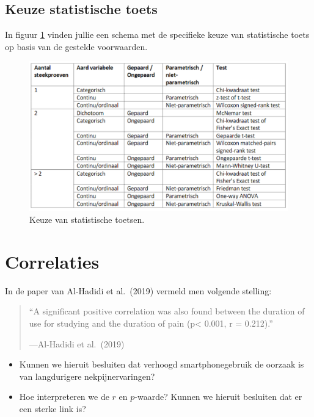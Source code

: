 \documentclass[
]{book}
\providecommand{\tightlist}{%
  \setlength{\itemsep}{0pt}\setlength{\parskip}{0pt}}
\theoremstyle{definition}
\theoremstyle{definition}
\theoremstyle{definition}
\theoremstyle{definition}
\theoremstyle{remark}
\begin{document}
\hypertarget{keuze-statistische-toets}{%
\section*{Keuze statistische toets}\label{keuze-statistische-toets}}


In figuur \ref{fig:stattest} vinden jullie een schema met de specifieke keuze van statistische toets op basis van de gestelde voorwaarden.

\begin{figure}
\includegraphics[width=1\linewidth]{img/stat_test} \caption{Keuze van statistische toetsen.}\label{fig:stattest}
\end{figure}

\mainmatter

\hypertarget{corr}{%
\chapter{Correlaties}\label{corr}}

In de paper van Al-Hadidi et al.~(2019) vermeld men volgende stelling:

\begin{quote}
``A significant positive correlation was also found between the duration of use for studying and the duration of pain (p\textless{} 0.001, r = 0.212).''

---Al-Hadidi et al.~(2019)
\end{quote}

\begin{itemize}
\tightlist
\item
  Kunnen we hieruit besluiten dat verhoogd smartphonegebruik de oorzaak is van langdurigere nekpijnervaringen?
\item
  Hoe interpreteren we de \(r\) en \(p\)-waarde? Kunnen we hieruit besluiten dat er een sterke link is?
\end{itemize}
\end{document}
